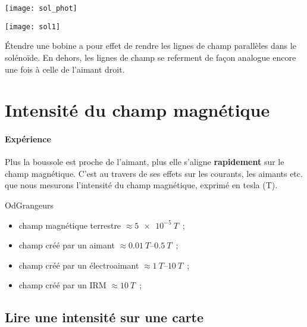 \documentclass[../main/main.tex]{subfiles}
\begin{document}
\noindent
\begin{minipage}[c]{.5\linewidth}
	\centering
	\texttt{[image: sol\_phot]}
	\label{fig:solphot}
\end{minipage}
\hfill
\begin{minipage}[c]{.5\linewidth}
	\centering
	\texttt{[image: sol1]}
	\label{fig:sol1}
\end{minipage}

Étendre une bobine a pour effet de rendre les lignes de champ parallèles dans le
solénoïde. En dehors, les lignes de champ se referment de façon analogue encore
une fois à celle de l'aimant droit.

\section{Intensité du champ magnétique}
\label{sec:intchp}
\paragraph*{Expérience} Plus la boussole est proche de l'aimant, plus elle
s'aligne \textbf{rapidement} sur le champ magnétique. C'est au travers de ses
effets sur les courants, les aimants etc. que nous mesurons l'intensité du champ
magnétique, exprimé en tesla (\si{T}).
\begin{rexem}{OdGrangeurs}
	\begin{itemize}[label=$\diamond$, leftmargin=10pt]
		\item champ magnétique terrestre      $ \approx \SI{5e-5}{T} $~;
		\item champ créé par un aimant        $ \approx \SIrange{0.01}{0.5}{T} $~;
		\item champ créé par un électroaimant $ \approx \SIrange{1}{10}{T} $~;
		\item champ créé par un IRM           $ \approx \SI{10}{T} $~;
	\end{itemize}
\end{rexem}

\subsection{Lire une intensité sur une carte}
\end{document}
